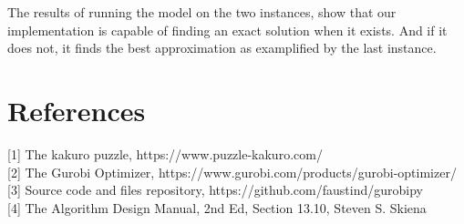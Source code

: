\documentclass[11pt]{article}
\begin{document}
    The results of running the model on the two instances, show that our
implementation is capable of finding an exact solution when it exists.
And if it does not, it finds the best approximation as examplified by
the last instance.

    \section{References}\label{references}

{[}1{]} The kakuro puzzle, https://www.puzzle-kakuro.com/\\
{[}2{]} The Gurobi Optimizer,
https://www.gurobi.com/products/gurobi-optimizer/\\
{[}3{]} Source code and files repository,
https://github.com/faustind/gurobipy\\
{[}4{]} The Algorithm Design Manual, 2nd Ed, Section 13.10, Steven S. Skiena


    
    
    
\end{document}
